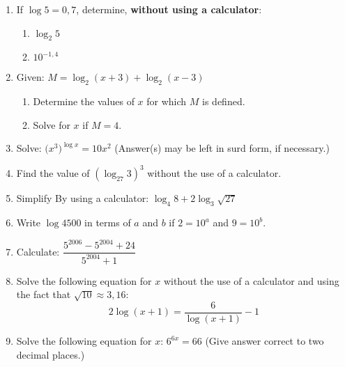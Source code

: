 \begin{eocexercises}{}
\begin{enumerate}
\item{If $\log 5 = 0,7$, determine, \textbf{without using a calculator}:
\begin{enumerate}
\item{$\log_2 5$}
\item{$10^{-1,4}$}
\end{enumerate}}

\item{Given: \qquad $M = \log_2 (x+3) + \log_2 (x-3)$
\begin{enumerate}
\item{Determine the values of $x$ for which $M$ is defined.}
\item{Solve for $x$ if $M = 4$.}
\end{enumerate}}

\item{Solve: \qquad $\biggl(x^3\biggr)^{\log x} = 10 x^2$ (Answer(s) may be left in surd form, if necessary.)}

\item{Find the value of $(\log_{27} 3)^3$ without the use of a calculator.}

\item{Simplify By using a calculator:  $\log_4 8 + 2 \log_3 \sqrt{27}$}

\item{Write $\log 4500$ in terms of $a$ and $b$ if $2=10^a$ and $9=10^b$.}

\item{Calculate: \qquad $\dfrac{5^{2006} - 5^{2004} + 24}{5^{2004} + 1}$}

\item{Solve the following equation for $x$ without the use of a calculator and using the fact that $\sqrt{10} \approx 3,16:$ $$2\log(x+1) = \dfrac{6}{\log(x+1)}-1$$}

\item{Solve the following equation for $x$: $6^{6x} = 66$ \quad (Give answer correct to two decimal places.)}

\end{enumerate}







\end{eocexercises}
